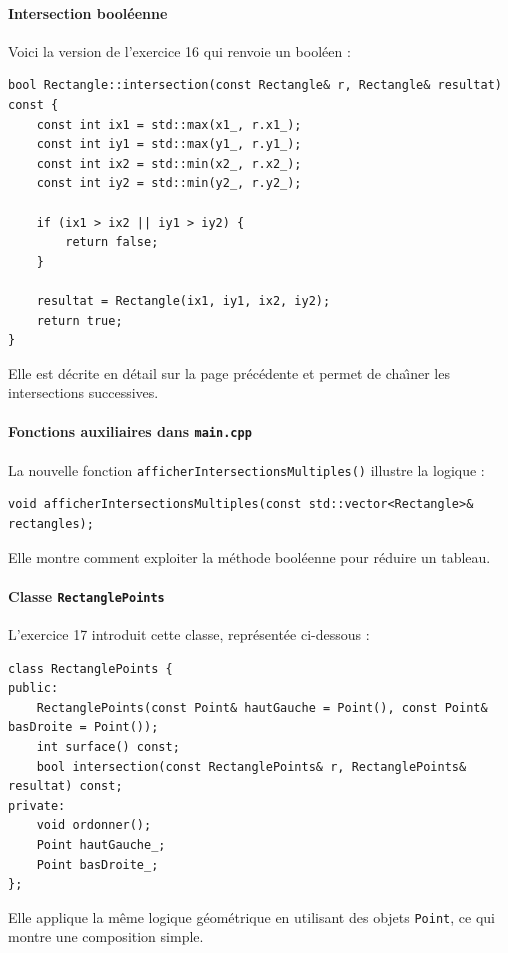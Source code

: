 \documentclass[12pt,a4paper]{article}
\begin{document}
\paragraph{Intersection bool\'eenne} Voici la version de l'exercice 16 qui renvoie un bool\'een :
\begin{lstlisting}[style=cppstyle]
bool Rectangle::intersection(const Rectangle& r, Rectangle& resultat) const {
    const int ix1 = std::max(x1_, r.x1_);
    const int iy1 = std::max(y1_, r.y1_);
    const int ix2 = std::min(x2_, r.x2_);
    const int iy2 = std::min(y2_, r.y2_);

    if (ix1 > ix2 || iy1 > iy2) {
        return false;
    }

    resultat = Rectangle(ix1, iy1, ix2, iy2);
    return true;
}
\end{lstlisting}
Elle est d\'ecrite en d\'etail sur la page pr\'ec\'edente et permet de cha\^\i ner les intersections successives.

\paragraph{Fonctions auxiliaires dans \texttt{main.cpp}} La nouvelle fonction \texttt{afficherIntersectionsMultiples()} illustre la logique :
\begin{lstlisting}[style=cppstyle]
void afficherIntersectionsMultiples(const std::vector<Rectangle>& rectangles);
\end{lstlisting}
Elle montre comment exploiter la m\'ethode bool\'eenne pour r\'eduire un tableau.

\paragraph{Classe \texttt{RectanglePoints}} L'exercice 17 introduit cette classe, repr\'esent\'ee ci-dessous :
\begin{lstlisting}[style=cppstyle]
class RectanglePoints {
public:
    RectanglePoints(const Point& hautGauche = Point(), const Point& basDroite = Point());
    int surface() const;
    bool intersection(const RectanglePoints& r, RectanglePoints& resultat) const;
private:
    void ordonner();
    Point hautGauche_;
    Point basDroite_;
};
\end{lstlisting}
Elle applique la m\^eme logique g\'eom\'etrique en utilisant des objets \texttt{Point}, ce qui montre une composition simple.
\end{document}
